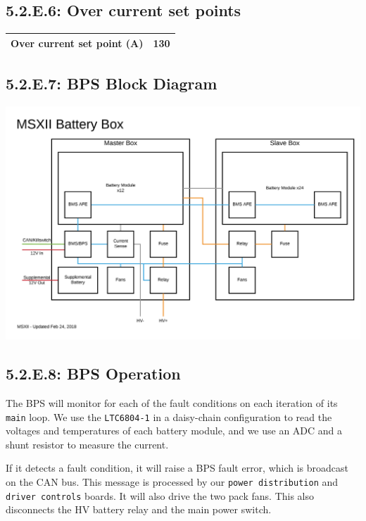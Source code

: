 \documentclass[10pt]{article}
\begin{document}
\subsection{5.2.E.6: Over current set points}

\begin{table}[!htbp]
\begin{tabular}{|l|l|}
\hline
\textbf{Over current set point (A)}    & 130 \\ \hline
\end{tabular}
\end{table}

\subsection{5.2.E.7: BPS Block Diagram}

\includegraphics[width=1\textwidth]{./figures/msxii-electrical-battery-box-block-diagram.png}

\subsection{5.2.E.8: BPS Operation}

The BPS will monitor for each of the fault conditions on each iteration of its
\texttt{main} loop. We use the \texttt{LTC6804-1} in a daisy-chain
configuration to read the voltages and temperatures of each battery module, and
we use an ADC and a shunt resistor to measure the current.

If it detects a fault condition, it will raise a BPS fault error, which is
broadcast on the CAN bus. This message is processed by our
\texttt{power distribution} and \texttt{driver controls} boards. It will also
drive the two pack fans. This also disconnects the HV battery relay and the
main power switch.
\end{document}
